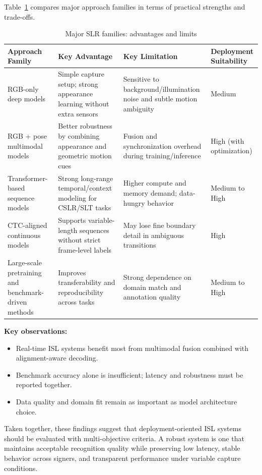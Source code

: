 Table~\ref{tab:approach-advantages-limitations} compares major approach families in terms of practical strengths and trade-offs.

\begin{table}[htbp]
\centering
\small
\renewcommand{\arraystretch}{1.15}
\setlength{\tabcolsep}{3.5pt}
\begin{tabularx}{\textwidth}{|>{\raggedright\arraybackslash}p{2.8cm}|>{\raggedright\arraybackslash}X|>{\raggedright\arraybackslash}X|>{\raggedright\arraybackslash}p{2.4cm}|}
\hline
\textbf{Approach Family} & \textbf{Key Advantage} & \textbf{Key Limitation} & \textbf{Deployment Suitability} \\ \hline
RGB-only deep models & Simple capture setup; strong appearance learning without extra sensors & Sensitive to background/illumination noise and subtle motion ambiguity & Medium \\ \hline
RGB + pose multimodal models & Better robustness by combining appearance and geometric motion cues & Fusion and synchronization overhead during training/inference & High (with optimization) \\ \hline
Transformer-based sequence models & Strong long-range temporal/context modeling for CSLR/SLT tasks & Higher compute and memory demand; data-hungry behavior & Medium to High \\ \hline
CTC-aligned continuous models & Supports variable-length sequences without strict frame-level labels & May lose fine boundary detail in ambiguous transitions & High \\ \hline
Large-scale pretraining and benchmark-driven methods & Improves transferability and reproducibility across tasks & Strong dependence on domain match and annotation quality & Medium to High \\ \hline
\end{tabularx}
\normalsize
\caption{Major SLR families: advantages and limits}
\label{tab:approach-advantages-limitations}
\end{table}

\textbf{Key observations:}
\begin{itemize}[leftmargin=1.5em]
\item Real-time ISL systems benefit most from multimodal fusion combined with alignment-aware decoding.
\item Benchmark accuracy alone is insufficient; latency and robustness must be reported together.
\item Data quality and domain fit remain as important as model architecture choice.
\end{itemize}

Taken together, these findings suggest that deployment-oriented ISL systems should be evaluated with multi-objective criteria. A robust system is one that maintains acceptable recognition quality while preserving low latency, stable behavior across signers, and transparent performance under variable capture conditions.
